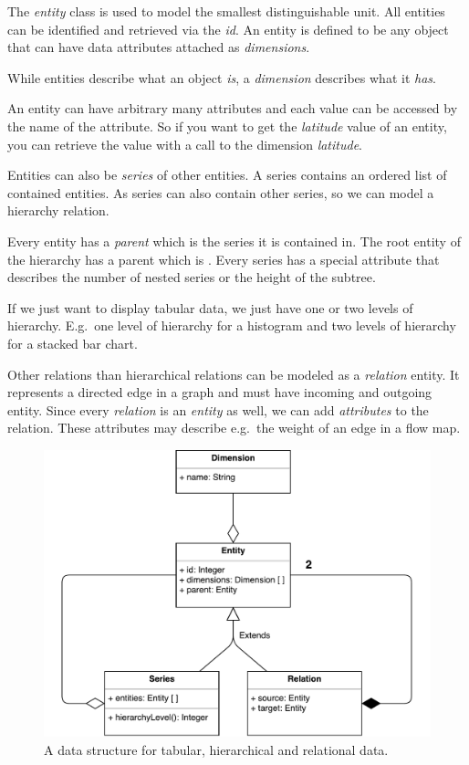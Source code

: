 The \emph{entity} class is used to model the smallest distinguishable unit.
All entities can be identified and retrieved via the \emph{id}.
An entity is defined to be any object that can have data attributes attached as \emph{dimensions}.

While entities describe what an object \emph{is}, a \emph{dimension} describes what it \emph{has}.

An entity can have arbitrary many attributes and each value can be accessed by the name of the attribute.
So if you want to get the \emph{latitude} value of an entity, you can retrieve the value with a call to the dimension \emph{latitude}.

Entities can also be \emph{series} of other entities.
A series contains an ordered list of contained entities.
As series can also contain other series, so we can model a hierarchy relation.

Every entity has a \emph{parent} which is the series it is contained in.
The root entity of the hierarchy has a parent which is .
Every series has a special attribute  that describes the number of nested series or the height of the subtree.

If we just want to display tabular data, we just have one or two levels of hierarchy.
E.g.\ one level of hierarchy for a histogram and two levels of hierarchy for a stacked bar chart.

Other relations than hierarchical relations can be modeled as a \emph{relation} entity.
It represents a directed edge in a graph and must have incoming and outgoing entity.
Since every \emph{relation} is an \emph{entity} as well, we can add \emph{attributes} to the relation.
These attributes may describe e.g.\ the weight of an edge in a flow map.

\begin{figure}[ht]
  \centering
  \includegraphics[width=\textwidth]{figures/concept/DataModel}
  \caption{%
    A data structure for tabular, hierarchical and relational data.
  }\label{fig:concept:shared-data-model}
\end{figure}



